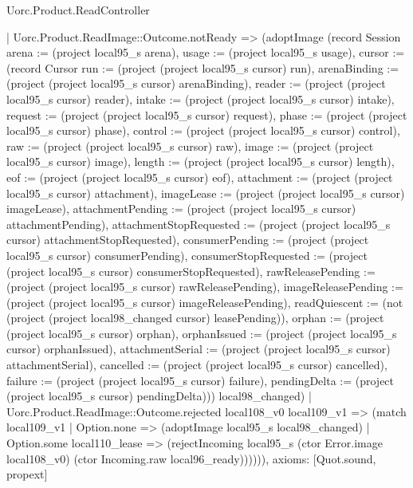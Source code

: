 \begin{lexlean}{Uorc.Product.ReadController}
\begin{semanticmodule}
{      | Uorc.Product.ReadImage::Outcome.notReady => (adoptImage (record Session {arena := (project local95_s arena), usage := (project local95_s usage), cursor := (record Cursor {run := (project (project local95_s cursor) run), arenaBinding := (project (project local95_s cursor) arenaBinding), reader := (project (project local95_s cursor) reader), intake := (project (project local95_s cursor) intake), request := (project (project local95_s cursor) request), phase := (project (project local95_s cursor) phase), control := (project (project local95_s cursor) control), raw := (project (project local95_s cursor) raw), image := (project (project local95_s cursor) image), length := (project (project local95_s cursor) length), eof := (project (project local95_s cursor) eof), attachment := (project (project local95_s cursor) attachment), imageLease := (project (project local95_s cursor) imageLease), attachmentPending := (project (project local95_s cursor) attachmentPending), attachmentStopRequested := (project (project local95_s cursor) attachmentStopRequested), consumerPending := (project (project local95_s cursor) consumerPending), consumerStopRequested := (project (project local95_s cursor) consumerStopRequested), rawReleasePending := (project (project local95_s cursor) rawReleasePending), imageReleasePending := (project (project local95_s cursor) imageReleasePending), readQuiescent := (not (project (project local98_changed cursor) leasePending)), orphan := (project (project local95_s cursor) orphan), orphanIssued := (project (project local95_s cursor) orphanIssued), attachmentSerial := (project (project local95_s cursor) attachmentSerial), cancelled := (project (project local95_s cursor) cancelled), failure := (project (project local95_s cursor) failure), pendingDelta := (project (project local95_s cursor) pendingDelta)})}) local98_changed)
      | Uorc.Product.ReadImage::Outcome.rejected local108_v0 local109_v1 => (match local109_v1
        | Option.none => (adoptImage local95_s local98_changed)
        | Option.some local110_lease => (rejectIncoming local95_s (ctor Error.image local108_v0) (ctor Incoming.raw local96_ready)))))),
  axioms: [Quot.sound, propext]
}


\end{semanticmodule}
\end{lexlean}
